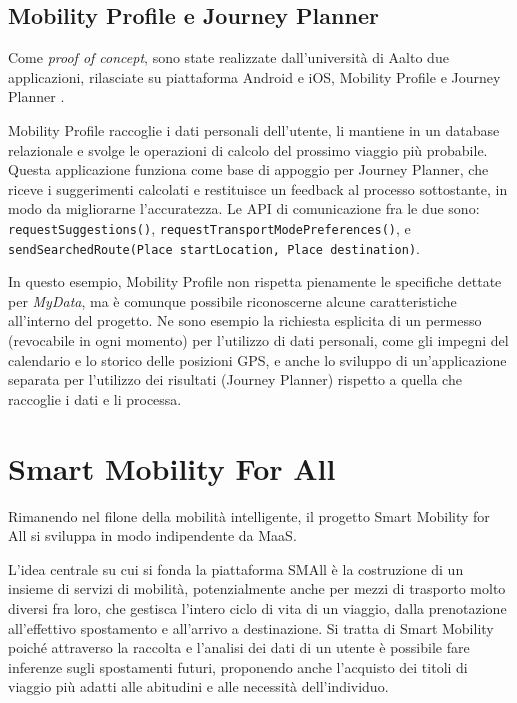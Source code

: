 \subsection{Mobility Profile e Journey Planner}
\label{sec:Contesto-MobProfJPlann}
Come \textit{proof of concept}, sono state realizzate dall’universit\`a di Aalto due applicazioni, rilasciate su piattaforma Android e iOS, Mobility Profile \cite{githubmobilityprofile} e Journey Planner \cite{githubjourneyplanner}.

Mobility Profile raccoglie i dati personali dell’utente, li mantiene in un database relazionale e svolge le operazioni di calcolo del prossimo viaggio pi\`u probabile. Questa applicazione funziona come base di appoggio per Journey Planner, che riceve i suggerimenti calcolati e restituisce un feedback al processo sottostante, in modo da migliorarne l’accuratezza. Le API di comunicazione fra le due sono:
\texttt{requestSuggestions()}, \texttt{requestTransportModePreferences()}, e \texttt{sendSearchedRoute(Place startLocation, Place destination)}.

In questo esempio, Mobility Profile non rispetta pienamente le specifiche dettate per \textit{MyData}, ma \`e comunque possibile riconoscerne alcune caratteristiche all’interno del progetto. Ne sono esempio la richiesta esplicita di un permesso (revocabile in ogni momento) per l’utilizzo di dati personali, come gli impegni del calendario e lo storico delle posizioni GPS, e anche lo sviluppo di un'applicazione separata per l’utilizzo dei risultati (Journey Planner) rispetto a quella che raccoglie i dati e li processa.

\section{Smart Mobility For All}
Rimanendo nel filone della mobilit\`a intelligente, il progetto Smart Mobility for All \cite{githubsmall} si sviluppa in modo indipendente da MaaS. 

L’idea centrale su cui si fonda la piattaforma SMAll \`e la costruzione di un insieme di servizi di mobilit\`a, potenzialmente anche per mezzi di trasporto molto diversi fra loro, che gestisca l’intero ciclo di vita di un viaggio, dalla prenotazione all’effettivo spostamento e all’arrivo a destinazione. Si tratta di Smart Mobility poich\'e attraverso la raccolta e l’analisi dei dati di un utente \`e possibile fare inferenze sugli spostamenti futuri, proponendo anche l’acquisto dei titoli di viaggio pi\`u adatti alle abitudini e alle necessit\`a dell’individuo.

